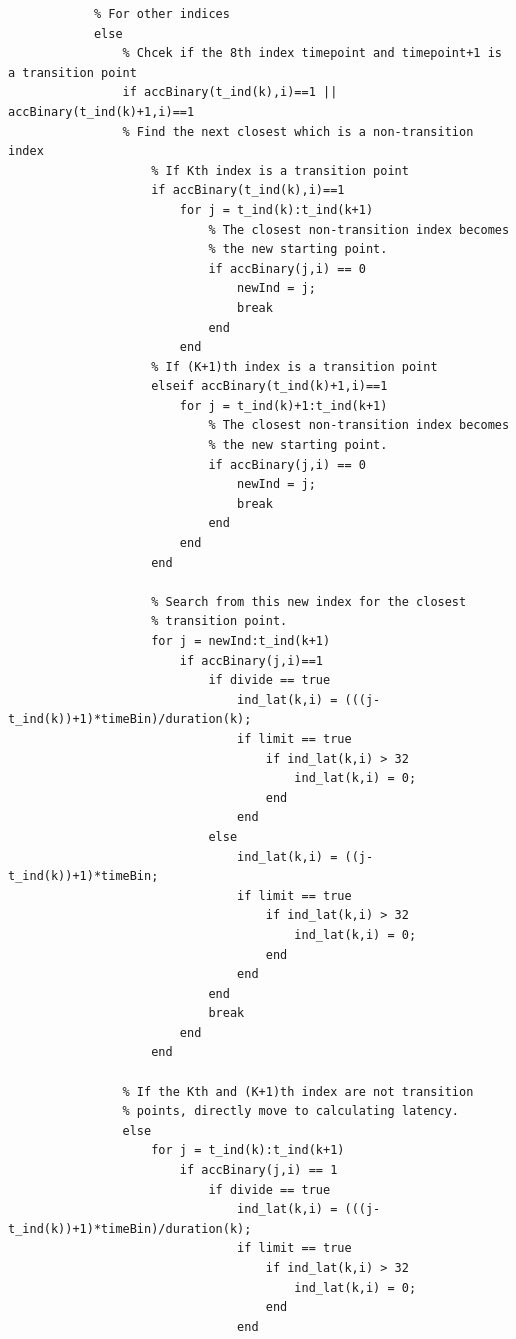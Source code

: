 \begin{lstlisting}
            % For other indices
            else
                % Chcek if the 8th index timepoint and timepoint+1 is a transition point
                if accBinary(t_ind(k),i)==1 || accBinary(t_ind(k)+1,i)==1
                % Find the next closest which is a non-transition index
                    % If Kth index is a transition point
                    if accBinary(t_ind(k),i)==1
                        for j = t_ind(k):t_ind(k+1)
                            % The closest non-transition index becomes
                            % the new starting point.
                            if accBinary(j,i) == 0
                                newInd = j;
                                break
                            end
                        end
                    % If (K+1)th index is a transition point    
                    elseif accBinary(t_ind(k)+1,i)==1
                        for j = t_ind(k)+1:t_ind(k+1)
                            % The closest non-transition index becomes
                            % the new starting point.
                            if accBinary(j,i) == 0
                                newInd = j;
                                break
                            end
                        end
                    end

                    % Search from this new index for the closest
                    % transition point. 
                    for j = newInd:t_ind(k+1)
                        if accBinary(j,i)==1
                            if divide == true
                                ind_lat(k,i) = (((j-t_ind(k))+1)*timeBin)/duration(k);
                                if limit == true
                                    if ind_lat(k,i) > 32 
                                        ind_lat(k,i) = 0; 
                                    end
                                end
                            else
                                ind_lat(k,i) = ((j-t_ind(k))+1)*timeBin;
                                if limit == true
                                    if ind_lat(k,i) > 32 
                                        ind_lat(k,i) = 0; 
                                    end
                                end
                            end
                            break
                        end
                    end

                % If the Kth and (K+1)th index are not transition
                % points, directly move to calculating latency.
                else 
                    for j = t_ind(k):t_ind(k+1)
                        if accBinary(j,i) == 1
                            if divide == true
                                ind_lat(k,i) = (((j-t_ind(k))+1)*timeBin)/duration(k);
                                if limit == true
                                    if ind_lat(k,i) > 32 
                                        ind_lat(k,i) = 0; 
                                    end
                                end


\end{lstlisting}
